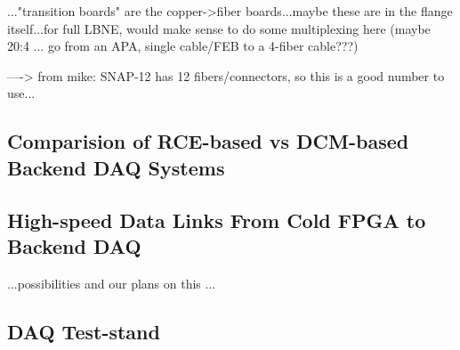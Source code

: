 ..."transition boards" are the copper->fiber boards...maybe these are in the flange itself...for full LBNE, would make sense to do some multiplexing here (maybe 20:4 ... go from an APA, single cable/FEB to a 4-fiber cable???)

----> from mike:  SNAP-12 has 12 fibers/connectors, so this is a good number to use...


\subsection{Comparision of RCE-based vs DCM-based Backend DAQ Systems}



\subsection{High-speed Data Links From Cold FPGA to Backend DAQ}

...possibilities and our plans on this ...


\subsection{DAQ Test-stand}


